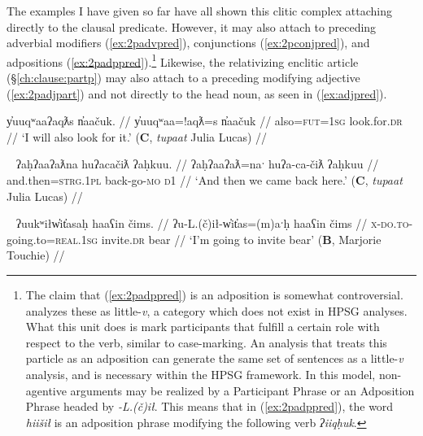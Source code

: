 The examples I have given so far have all shown this clitic complex attaching directly to the clausal predicate. However, it may also attach to preceding adverbial modifiers (\ref{ex:2padvpred}), conjunctions (\ref{ex:2pconjpred}), and adpositions (\ref{ex:2padppred}).\footnote{The claim that (\ref{ex:2padppred}) is an adposition is somewhat controversial. \cite{woo2007b} analyzes these as little-\textit{v}, a category which does not exist in HPSG analyses. What this unit does is mark participants that fulfill a certain role with respect to the verb, similar to case-marking. An analysis that treats this particle as an adposition can generate the same set of sentences as a little-\textit{v} analysis, and is necessary within the HPSG framework. In this model, non-agentive arguments may be realized by a Participant Phrase or an Adposition Phrase headed by \textit{-L.(č)ił}. This means that in (\ref{ex:2padppred}), the word \textit{hiišił} is an adposition phrase modifying the following verb \textit{ʔiiqḥuk}.} Likewise, the relativizing enclitic article (\S\ref{ch:clause:partp}) may also attach to a preceding modifying adjective (\ref{ex:2padjpart}) and not directly to the head noun, as seen in (\ref{ex:adjpred}).

\ex \label{ex:2padvpred}
\begingl
\glpreamble y̓uuqʷaaʔaqƛs n̓aačuk. //
\gla y̓uuqʷaa=!aqƛ=s n̓aačuk  //
\glb also=\textsc{fut}=\textsc{1sg} look.for.\textsc{dr} //
\glft `I will also look for it.' (\textbf{C}, \textit{tupaat} Julia Lucas) //
\endgl
\xe

\ex~ \label{ex:2pconjpred}
\begingl
\glpreamble ʔaḥʔaaʔaƛna huʔacačiƛ ʔaḥkuu. //
\gla ʔaḥʔaaʔaƛ=naˑ huʔa-ca-čiƛ ʔaḥkuu  //
\glb and.then=\textsc{strg.1pl} back-go-\textsc{mo} \textsc{d1} //
\glft `And then we came back here.' (\textbf{C}, \textit{tupaat} Julia Lucas) //
\endgl
\xe


\ex~ \label{ex:2padppred}
\begingl
\glpreamble ʔuukʷiłw̓it̓asaḥ haaʕin čims. //
\gla ʔu-L.(č)ił-w̓it̓as=(m)aˑḥ haaʕin čims  //
\glb \textsc{x}-\textsc{do.to}-going.to=\textsc{real.1sg} invite.\textsc{dr} bear //
\glft `I'm going to invite bear' (\textbf{B}, Marjorie Touchie) //
\endgl
\xe

